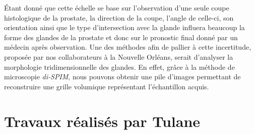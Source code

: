 {{		\par

		Étant donné que cette échelle se base sur l'observation d'une seule coupe histologique de la prostate, la direction de la coupe, l'angle de celle-ci, son orientation ainsi que le type d'intersection avec la glande influera beaucoup la forme des glandes de la prostate et donc sur le pronostic final donné par un médecin après observation. Une des méthodes afin de pallier à cette incertitude, proposée par nos collaborateurs à la Nouvelle Orléans, serait d'analyser la morphologie tridimensionnelle des glandes. En effet, grâce à la méthode de microscopie \textit{di-SPIM}, nous pouvons obtenir une pile d'images permettant de reconstruire une grille volumique représentant l'échantillon acquis.\par

	}

	\section{Travaux réalisés par Tulane}
	{
		\par

		\par
	}

	\\
}

